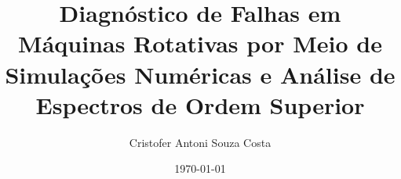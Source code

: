 \documentclass[12pt,a4paper,oneside]{memoir}
\title{Diagnóstico de Falhas em Máquinas Rotativas por Meio de Simulações Numéricas e Análise de Espectros de Ordem Superior}
\author{Cristofer Antoni Souza Costa}
\date{\today}
\begin{document}
\frontmatter





\tableofcontents*

\mainmatter






\backmatter


\end{document}
